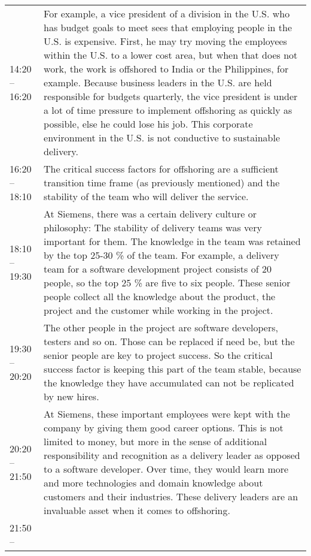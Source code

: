 \begin{appendix}
\begin{longtable}{l p{12.5cm}}
	14:20 -- 16:20& For example, a vice president of a division in the U.S. who has budget goals to meet sees that employing people in the U.S. is expensive. First, he may try moving the employees within the U.S. to a lower cost area, but when that does not work, the work is offshored to India or the Philippines, for example. Because business leaders in the U.S. are held responsible for budgets quarterly, the vice president is under a lot of time pressure to implement offshoring as quickly as possible, else he could lose his job. This corporate environment in the U.S. is not conductive to sustainable delivery.\\
	16:20 -- 18:10&The critical success factors for offshoring are a sufficient transition time frame (as previously mentioned) and the stability of the team who will deliver the service.\\
	18:10 -- 19:30&At Siemens, there was a certain delivery culture or philosophy: The stability of delivery teams was very important for them. The knowledge in the team was retained by the top 25-30 \% of the team. For example, a delivery team for a software development project consists of 20 people, so the top 25 \% are five to six people. These senior people collect all the knowledge about the product, the project and the customer while working in the project.\\
	19:30 -- 20:20& The other people in the project are software developers, testers and so on. Those can be replaced if need be, but the senior people are key to project success. So the critical success factor is keeping this part of the team stable, because the knowledge they have accumulated can not be replicated by new hires.\\
	20:20 -- 21:50 & At Siemens, these important employees were kept with the company by giving them good career options. This is not limited to money, but more in the sense of additional responsibility and recognition as a delivery leader as opposed to a software developer. Over time, they would learn more and more technologies and domain knowledge about customers and their industries. These delivery leaders are an invaluable asset when it comes to offshoring.\\
	21:50 -- 
\end{longtable}	

\end{appendix}	